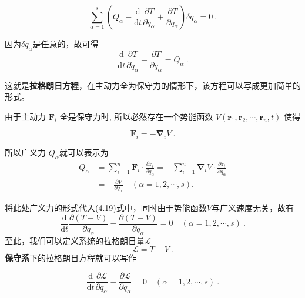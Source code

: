 \documentclass[a4paper,c5size,twoside,UTF8]{ctexart} %
\numberwithin{equation}{section}   %
\begin{document}
\begin{equation}
    \sum_{\alpha=1}^{s}\left(Q_{\alpha}-\frac{\mathrm{d}}{\mathrm{d} t} \frac{\partial T}{\partial \dot{q}_{\alpha}}+\frac{\partial T}{\partial q_{\alpha}}\right) \delta q_{\alpha}=0~.
\end{equation}

因为$\delta q_\alpha$是任意的，故可得
\begin{equation}
    \frac{\mathrm{d}}{\mathrm{d} t} \frac{\partial T}{\partial \dot{q}_{\alpha}}-\frac{\partial T}{\partial q_{\alpha}}=Q_{\alpha}~.
\end{equation}

这就是\textbf{拉格朗日方程}，在主动力全为保守力的情形下，该方程可以写成更加简单的形式。

由于主动力  $\boldsymbol{F}_{i}$  全是保守力时, 所以必然存在一个势能函数 $ V\left(\boldsymbol{r}_{1}, \boldsymbol{r}_{2}, \cdots, \boldsymbol{r}_{n}, t\right) $ 使得

\begin{equation}
    \boldsymbol{F}_{i}=-\boldsymbol{\nabla}_{i} V~.
\end{equation}


所以广义力 $ Q_{\alpha} $就可以表示为
\begin{equation}
\begin{aligned}
Q_{\alpha} & =\sum_{i=1}^{n} \boldsymbol{F}_{i} \cdot \frac{\partial \boldsymbol{r}_{i}}{\partial q_{\alpha}}=-\sum_{i=1}^{n} \boldsymbol{\nabla}_{i} V \cdot \frac{\partial \boldsymbol{r}_{i}}{\partial q_{\alpha}} \\
& =-\frac{\partial V}{\partial q_{\alpha}} \quad(\alpha=1,2, \cdots, s) .
\end{aligned}
\end{equation}

将此处广义力的形式代入(4.19)式中，同时由于势能函数$V$与广义速度无关，故有
\begin{equation}
    \frac{\mathrm{d}}{\mathrm{d} t} \frac{\partial(T-V)}{\partial \dot{q}_{\alpha}}-\frac{\partial(T-V)}{\partial q_{\alpha}}=0 \quad(\alpha=1,2, \cdots, s)~.
\end{equation}
至此，我们可以定义系统的拉格朗日量$\mathcal{L}$
\begin{equation}
    \mathcal{L}=T-V~.
\end{equation}
\textbf{保守系}下的拉格朗日方程就可以写作

\begin{equation}
    \frac{\mathrm{d}}{\mathrm{d} t} \frac{\partial \mathcal{L}}{\partial \dot{q}_{\alpha}}-\frac{\partial \mathcal{L}}{\partial q_{\alpha}}=0 \quad(\alpha=1,2, \cdots, s)~.
\end{equation}
\end{document}
